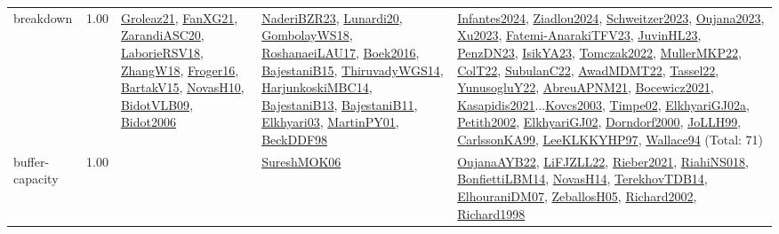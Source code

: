 {\begin{longtable}{p{3cm}r>{\raggedright\arraybackslash}p{6cm}>{\raggedright\arraybackslash}p{6cm}>{\raggedright\arraybackslash}p{8cm}}
\index{breakdown}\index{Concepts!breakdown}breakdown &  1.00 & \hyperref[detail:Groleaz21]{Groleaz21}, \hyperref[detail:FanXG21]{FanXG21}, \hyperref[detail:ZarandiASC20]{ZarandiASC20}, \hyperref[detail:LaborieRSV18]{LaborieRSV18}, \hyperref[detail:ZhangW18]{ZhangW18}, \hyperref[detail:Froger16]{Froger16}, \hyperref[detail:BartakV15]{BartakV15}, \hyperref[detail:NovasH10]{NovasH10}, \hyperref[detail:BidotVLB09]{BidotVLB09}, \hyperref[detail:Bidot2006]{Bidot2006} & \hyperref[detail:NaderiBZR23]{NaderiBZR23}, \hyperref[detail:Lunardi20]{Lunardi20}, \hyperref[detail:GombolayWS18]{GombolayWS18}, \hyperref[detail:RoshanaeiLAU17]{RoshanaeiLAU17}, \hyperref[detail:Boek2016]{Boek2016}, \hyperref[detail:BajestaniB15]{BajestaniB15}, \hyperref[detail:ThiruvadyWGS14]{ThiruvadyWGS14}, \hyperref[detail:HarjunkoskiMBC14]{HarjunkoskiMBC14}, \hyperref[detail:BajestaniB13]{BajestaniB13}, \hyperref[detail:BajestaniB11]{BajestaniB11}, \hyperref[detail:Elkhyari03]{Elkhyari03}, \hyperref[detail:MartinPY01]{MartinPY01}, \hyperref[detail:BeckDDF98]{BeckDDF98} & \hyperref[detail:Infantes2024]{Infantes2024}, \hyperref[detail:Ziadlou2024]{Ziadlou2024}, \hyperref[detail:Schweitzer2023]{Schweitzer2023}, \hyperref[detail:Oujana2023]{Oujana2023}, \hyperref[detail:Xu2023]{Xu2023}, \hyperref[detail:Fatemi-AnarakiTFV23]{Fatemi-AnarakiTFV23}, \hyperref[detail:JuvinHL23]{JuvinHL23}, \hyperref[detail:PenzDN23]{PenzDN23}, \hyperref[detail:IsikYA23]{IsikYA23}, \hyperref[detail:Tomczak2022]{Tomczak2022}, \hyperref[detail:MullerMKP22]{MullerMKP22}, \hyperref[detail:ColT22]{ColT22}, \hyperref[detail:SubulanC22]{SubulanC22}, \hyperref[detail:AwadMDMT22]{AwadMDMT22}, \hyperref[detail:Tassel22]{Tassel22}, \hyperref[detail:YunusogluY22]{YunusogluY22}, \hyperref[detail:AbreuAPNM21]{AbreuAPNM21}, \hyperref[detail:Bocewicz2021]{Bocewicz2021}, \hyperref[detail:Kasapidis2021]{Kasapidis2021}...\hyperref[detail:Kovcs2003]{Kovcs2003}, \hyperref[detail:Timpe02]{Timpe02}, \hyperref[detail:ElkhyariGJ02a]{ElkhyariGJ02a}, \hyperref[detail:Petith2002]{Petith2002}, \hyperref[detail:ElkhyariGJ02]{ElkhyariGJ02}, \hyperref[detail:Dorndorf2000]{Dorndorf2000}, \hyperref[detail:JoLLH99]{JoLLH99}, \hyperref[detail:CarlssonKA99]{CarlssonKA99}, \hyperref[detail:LeeKLKKYHP97]{LeeKLKKYHP97}, \hyperref[detail:Wallace94]{Wallace94} (Total: 71)\\
\index{buffer-capacity}\index{Concepts!buffer-capacity}buffer-capacity &  1.00 &  & \hyperref[detail:SureshMOK06]{SureshMOK06} & \hyperref[detail:OujanaAYB22]{OujanaAYB22}, \hyperref[detail:LiFJZLL22]{LiFJZLL22}, \hyperref[detail:Rieber2021]{Rieber2021}, \hyperref[detail:RiahiNS018]{RiahiNS018}, \hyperref[detail:BonfiettiLBM14]{BonfiettiLBM14}, \hyperref[detail:NovasH14]{NovasH14}, \hyperref[detail:TerekhovTDB14]{TerekhovTDB14}, \hyperref[detail:ElhouraniDM07]{ElhouraniDM07}, \hyperref[detail:ZeballosH05]{ZeballosH05}, \hyperref[detail:Richard2002]{Richard2002}, \hyperref[detail:Richard1998]{Richard1998}\\

\end{longtable}}
